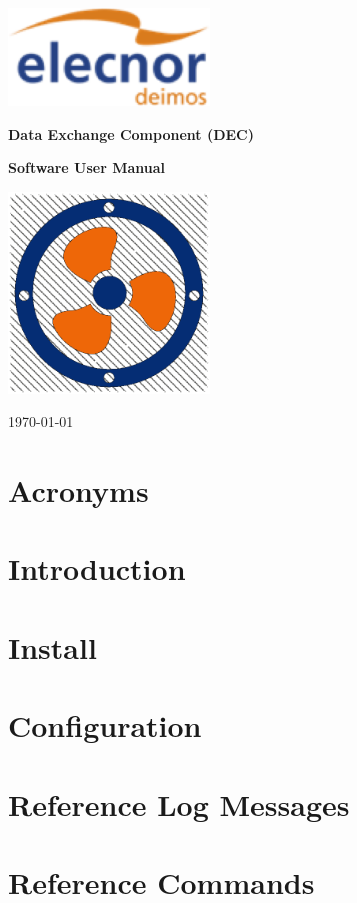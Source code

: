 \documentclass[
	oneside,
	openany,
	a4paper,
	headings=optiontoheadandtoc
	]{book}
\begin{document}

\begin{titlepage}
	\begin{center}
		
		\includegraphics[width=0.4\textwidth]{logo_elecnor_deimos.png}
		
		\vspace*{1cm}
		\Large
		\textbf{Data Exchange Component (DEC)}
		
		\textbf{Software User Manual}
		
		\vspace*{1cm}
		
		\includegraphics[width=0.4\textwidth]{DEC_Logo_White.png}
		
		\vspace{0.8cm}
		
		\today
		
	\end{center}
\end{titlepage}
	


\tableofcontents
\newpage

\chapter{Acronyms}
 
\newpage
 
\chapter{Introduction}

\newpage

\chapter{Install}

 
\chapter{Configuration}


\chapter{Reference Log Messages}


\chapter{Reference Commands}

 
\end{document}
